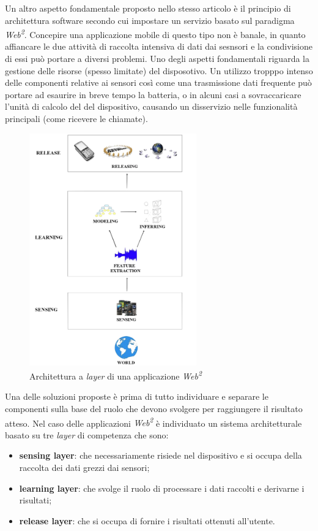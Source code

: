 Un altro aspetto fondamentale proposto nello stesso articolo è il principio di architettura software secondo cui impostare un servizio basato sul paradigma \emph{Web\textsuperscript{2}}. Concepire una applicazione mobile di questo tipo non è banale, in quanto affiancare le due attività di raccolta intensiva di dati dai sesnsori e la condivisione di essi può portare a diversi problemi. Uno degli aspetti fondamentali riguarda la gestione delle risorse (spesso limitate) del disposotivo. Un utilizzo tropppo intenso delle componenti relative ai sensori così come una trasmissione dati frequente può portare ad esaurire in breve tempo la batteria, o in alcuni casi a sovraccaricare l'unità di calcolo del del dispositivo, causando un disservizio nelle funzionalità principali (come ricevere le chiamate). 
\begin{figure}[ht]
  \centering
  \includegraphics[height=10cm]{images/layers}
  \caption{\footnotesize{Architettura a \emph{layer} di una applicazione \emph{Web\textsuperscript{2}}}}
  \label{fig:layers}
\end{figure}
Una delle soluzioni proposte è prima di tutto individuare e separare le componenti sulla base del ruolo che devono svolgere per raggiungere il risultato atteso. Nel caso delle applicazioni \emph{Web\textsuperscript{2}} è individuato un sistema architetturale basato su tre \emph{layer} di competenza che sono:
\begin{itemize}
  \item \textbf{sensing layer}: che necessariamente risiede nel dispositivo e si occupa della raccolta dei dati grezzi dai sensori;
  \item \textbf{learning layer}: che svolge il ruolo di processare i dati raccolti e derivarne i risultati;
  \item \textbf{release layer}: che si occupa di fornire i risultati ottenuti all'utente.
\end{itemize}
